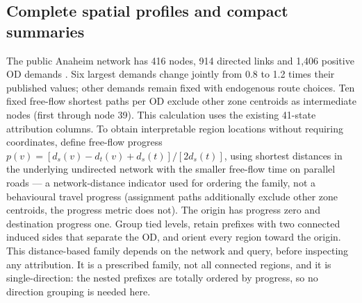 \subsection{Complete spatial profiles and compact summaries}\label{sec:anaheim}
The public Anaheim network has 416 nodes, 914 directed links and 1,406 positive OD demands \citep{tnfrc2024transportation}. Six largest demands change jointly from 0.8 to 1.2 times their published values; other demands remain fixed with endogenous route choices. Ten fixed free-flow shortest paths per OD exclude other zone centroids as intermediate nodes (first through node 39). This calculation uses the existing 41-state attribution columns.
To obtain interpretable region locations without requiring coordinates, define free-flow progress $p(v)=[d_s(v)-d_t(v)+d_s(t)]/[2d_s(t)]$, using shortest distances in the underlying undirected network with the smaller free-flow time on parallel roads --- a network-distance indicator used for ordering the family, not a behavioural travel progress (assignment paths additionally exclude other zone centroids, the progress metric does not). The origin has progress zero and destination progress one. Group tied levels, retain prefixes with two connected induced sides that separate the OD, and orient every region toward the origin. This distance-based family depends on the network and query, before inspecting any attribution. It is a prescribed family, not all connected regions, and it is single-direction: the nested prefixes are totally ordered by progress, so no direction grouping is needed here.

